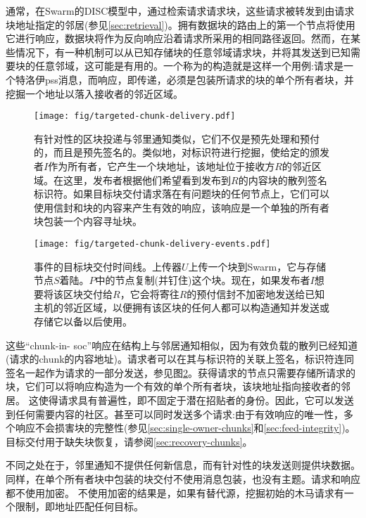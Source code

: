 通常，在Swarm的DISC模型中，通过检索请求请求块，这些请求被转发到由请求块地址指定的邻居(参见\ref{sec:retrieval})。拥有数据块的路由上的第一个节点将使用它进行响应，数据块将作为反向响应沿着请求所采用的相同路径返回。然而，在某些情况下，有一种机制可以从已知存储块的任意邻域请求块，并将其发送到已知需要块的任意邻域，这可能是有用的。一个称为的构造就是这样一个用例:请求是一个特洛伊pss消息，而响应，即传递，必须是包装所请求的块的单个所有者块，并挖掘一个地址以落入接收者的邻近区域。  


\begin{figure}[htbp]
\centering
\texttt{[image: fig/targeted-chunk-delivery.pdf]}      
\caption[目标块交付\statusgreen]{有针对性的区块投递与邻里通知类似，它们不仅是预先处理和预付的，而且是预先签名的。类似地，对标识符进行挖掘，使给定的颁发者$I$作为所有者，它产生一个块地址，该地址位于接收方$R$的邻近区域。在这里，发布者根据他们希望看到发布到$R$的内容块的散列签名标识符。如果目标块交付请求落在有问题块的任何节点上，它们可以使用信封和块的内容来产生有效的响应，该响应是一个单独的所有者块包装一个内容寻址块。}
\label{fig:targeted-chunk-delivery}
\end{figure}

\begin{figure}[htbp]
\centering
\texttt{[image: fig/targeted-chunk-delivery-events.pdf]}
\caption[事件的目标块交付时间\statusgreen]{事件的目标块交付时间线。上传器$U$上传一个块到Swarm，它与存储节点$S$着陆。$P$中的节点复制(并钉住)这个块。现在，如果发布者$I$想要将该区块交付给$R$，它会将寄往$R$的预付信封不加密地发送给已知主机的邻近区域，以便拥有该区块的任何人都可以构造通知并发送或存储它以备以后使用。}
\label{fig:targeted-chunk-delivery-events}
\end{figure}



这些“chunk-in- soc”响应在结构上与邻居通知相似，因为有效负载的散列已经知道(请求的chunk的内容地址)。请求者可以在其与标识符的关联上签名，标识符连同签名一起作为请求的一部分发送，参见图\ref{fig:targeted-chunk-delivery-events}。获得请求的节点只需要存储所请求的块，它们可以将响应构造为一个有效的单个所有者块，该块地址指向接收者的邻居。
这使得请求具有普遍性，即不固定于潜在招贴者的身份。因此，它可以发送到任何需要内容的社区。甚至可以同时发送多个请求:由于有效响应的唯一性，多个响应不会损害块的完整性(参见\ref{sec:single-owner-chunks}和\ref{sec:feed-integrity})。目标交付用于缺失块恢复，请参阅\ref{sec:recovery-chunks}。

不同之处在于，邻里通知不提供任何新信息，而有针对性的块发送则提供块数据。同样，在单个所有者块中包装的块交付不使用消息包装，也没有主题。请求和响应都不使用加密。
不使用加密的结果是，如果有替代源，挖掘初始的木马请求有一个限制，即地址匹配任何目标。

